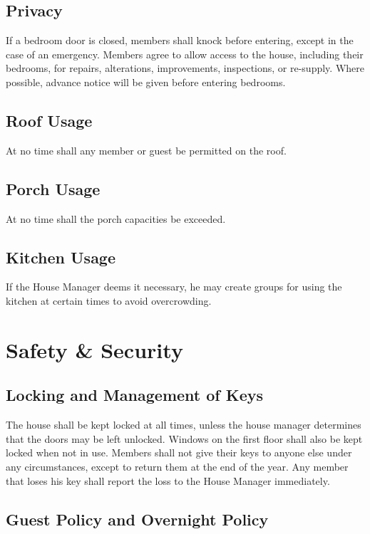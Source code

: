\subsection{Privacy}

If a bedroom door is closed, members shall knock before entering, except in the
case of an emergency.
Members agree to allow access to the house, including their bedrooms, for
repairs, alterations, improvements, inspections, or re-supply.  Where possible,
advance notice will be given before entering bedrooms.

\subsection{Roof Usage}

At no time shall any member or guest be permitted on the roof.

\subsection{Porch Usage}

At no time shall the porch capacities be exceeded.

\subsection{Kitchen Usage}

If the House Manager deems it necessary, he may create groups for using the
kitchen at certain times to avoid overcrowding.

\section{Safety \& Security}

\subsection{Locking and Management of Keys}

The house shall be kept locked at all times, unless the house manager
determines that the doors may be left unlocked.
Windows on the first floor shall also be kept locked when not in use.
Members shall not give their keys to anyone else under any circumstances,
except to return them at the end of the year.
Any member that loses his key shall report the loss to the House Manager
immediately.

\subsection{Guest Policy and Overnight Policy}

